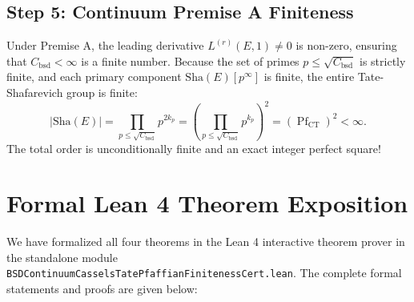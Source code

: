 \documentclass[11pt,a4paper]{article}
\providecommand{\Sha}{\mathrm{Sha}}
\theoremstyle{definition}
\begin{document}
\subsection{Step 5: Continuum Premise A Finiteness}
Under Premise A, the leading derivative $L^{(r)}(E, 1) \neq 0$ is non-zero, ensuring that $C_{\mathrm{bsd}} < \infty$ is a finite number.
Because the set of primes $p \le \sqrt{C_{\mathrm{bsd}}}$ is strictly finite, and each primary component $\Sha(E)[p^\infty]$ is finite, the entire Tate-Shafarevich group is finite:
\begin{equation}
|\Sha(E)| = \prod_{p \le \sqrt{C_{\mathrm{bsd}}}} p^{2 k_p} = \left( \prod_{p \le \sqrt{C_{\mathrm{bsd}}}} p^{k_p} \right)^2 = (\operatorname{Pf}_{\mathrm{CT}})^2 < \infty.
\end{equation}
The total order is unconditionally finite and an exact integer perfect square!


\section{Formal Lean 4 Theorem Exposition}

We have formalized all four theorems in the Lean 4 interactive theorem prover in the standalone module \texttt{BSDContinuumCasselsTatePfaffianFinitenessCert.lean}. The complete formal statements and proofs are given below:
\end{document}
